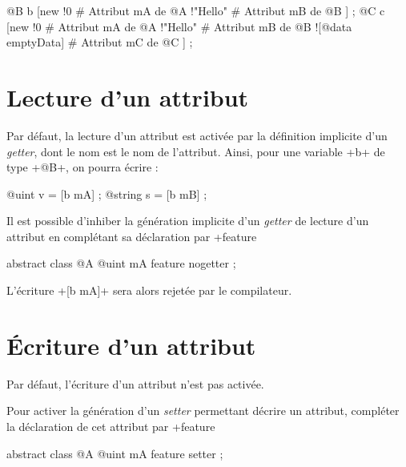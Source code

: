 \begin{galgas}
@B b [new
  !0 # Attribut mA de @A
  !"Hello" # Attribut mB de @B
] ;
@C c [new
  !0 # Attribut mA de @A
  !"Hello" # Attribut mB de @B
  ![@data emptyData] # Attribut mC de @C
] ;
\end{galgas}








\section{Lecture d'un attribut}

Par défaut, la lecture d'un attribut est activée par la définition implicite d'un \emph{getter}, dont le nom est le nom de l'attribut. Ainsi, pour une variable \ggs+b+ de type \ggs+@B+, on pourra écrire :

\begin{galgas}
@uint v = [b mA] ;
@string s = [b mB] ;
\end{galgas}

Il est possible d'inhiber la génération implicite d'un \emph{getter} de lecture d'un attribut en complétant sa déclaration par \ggs+feature %

\begin{galgas}
abstract class @A {
  @uint mA feature nogetter ;
}
\end{galgas}

L'écriture \ggs+[b mA]+ sera alors rejetée par le compilateur.









\section{Écriture d'un attribut}

Par défaut, l'écriture d'un attribut n'est pas activée.

Pour activer la génération d'un \emph{setter} permettant décrire un attribut, compléter la déclaration de cet attribut par \ggs+feature %

\begin{galgas}
abstract class @A {
  @uint mA feature setter ;
}
\end{galgas}



